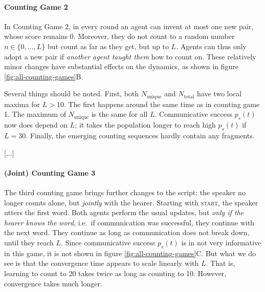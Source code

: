 \documentclass{../src/bcthesispart}
\begin{document}
\paragraph{Counting Game 2}
In Counting Game 2, in every round an agent can invent at most one new pair, whose score remains 0. 
Moreover, they do not count to a random number $n \in \{0, \dots, L\}$ but count as far as they get, but up to $L$.
Agents can thus only adopt a new pair if \emph{another agent taught them} how to count on.
These relatively minor changes have substantial effects on the dynamics, as shown in figure \ref{fig:all-counting-games}B.


Several things should be noted.
First, both $N_{\text{unique}}$ and $N_{\text{total}}$ have two local maxima for $L>10$. 
The first happens around the same time as in counting game 1.
The maximum of $N_{\text{unique}}$ is the same for all $L$.
Communicative success $p_s(t)$ now does depend on $L$; it takes the population longer to reach high $p_s(t)$ if $L = 30$.
Finally, the emerging counting sequences hardly contain any fragments.

[...]



\paragraph{(Joint) Counting Game 3}
The third counting game brings further changes to the script: the speaker no longer counts alone, but \emph{jointly} with the hearer.
Starting with \textsc{start}, the speaker utters the first word. 
Both agents perform the usual updates, but \emph{only if the hearer knows the word}, i.e.\ if communication was successful, they continue with the next word.
They continue as long as communication does not break down, until they reach $L$.
Since communicative success $p_s(t)$ is in not very informative in this game, it is not shown in figure \ref{fig:all-counting-games}C.
But what we do see is that the convergence time appears to scale linearly with $L$. 
That is, learning to count to 20 takes twice as long as counting to 10.
However, convergence takes much longer.


\end{document}
